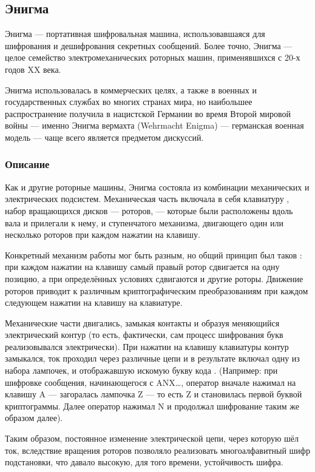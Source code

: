 \subsection{Энигма}
Энигма — портативная шифровальная машина, использовавшаяся для шифрования 
и дешифрования секретных сообщений. Более точно, Энигма — целое семейство 
электромеханических роторных машин, применявшихся с 20-х годов XX 
века.

Энигма использовалась в коммерческих целях, а также в военных и государственных 
службах во многих странах мира, но наибольшее распространение получила 
в нацистской Германии во время Второй мировой войны — именно Энигма 
вермахта (Wehrmacht Enigma) — германская военная модель — чаще всего 
является предметом дискуссий.

\subsubsection{Описание}
Как и другие роторные машины, Энигма состояла из комбинации механических 
и электрических подсистем. Механическая часть включала в себя клавиатуру
, набор вращающихся дисков — роторов, — которые были расположены вдоль 
вала и прилегали к нему, и ступенчатого механизма, двигающего один 
или несколько роторов при каждом нажатии на клавишу.

Конкретный механизм работы мог быть разным, но общий принцип был таков
: при каждом нажатии на клавишу самый правый ротор сдвигается на одну 
позицию, а при определённых условиях сдвигаются и другие роторы. Движение 
роторов приводит к различным криптографическим преобразованиям при 
каждом следующем нажатии на клавишу на клавиатуре.

Механические части двигались, замыкая контакты и образуя меняющийся 
электрический контур (то есть, фактически, сам процесс шифрования 
букв реализовывался электрически). При нажатии на клавишу клавиатуры 
контур замыкался, ток проходил через различные цепи и в результате 
включал одну из набора лампочек, и отображавшую искомую букву кода
. (Например: при шифровке сообщения, начинающегося с ANX…, оператор 
вначале нажимал на клавишу A — загоралась лампочка Z — то есть Z и 
становилась первой буквой криптограммы. Далее оператор нажимал N и 
продолжал шифрование таким же образом далее).

Таким образом, постоянное изменение электрической цепи, через которую 
шёл ток, вследствие вращения роторов позволяло реализовать многоалфавитный 
шифр подстановки, что давало высокую, для того времени, устойчивость шифра.

